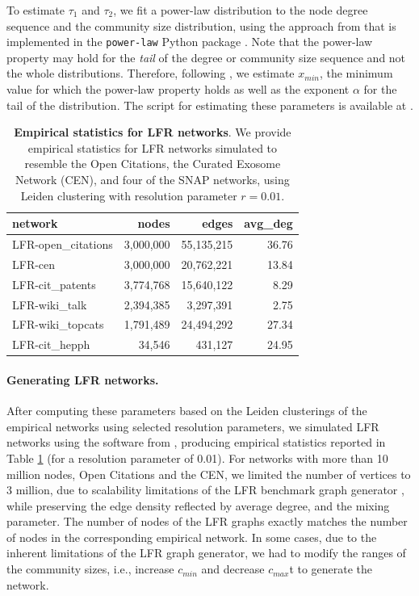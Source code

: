 \documentclass[11pt]{article}   	%
\begin{document}
To estimate $\tau_1$ and $\tau_2$, we fit a power-law distribution to the node degree sequence and the community size distribution, using the approach from \cite{clauset2009power} that is implemented in the \texttt{power-law} Python package \citep{alstott2014powerlaw}. Note that the power-law property may hold for the \textit{tail} of the degree or community size sequence and not the whole distributions. Therefore, following \cite{clauset2009power}, we estimate $x_{min}$, the minimum value for which the power-law property holds as well as the exponent $\alpha$ for the tail of the distribution. The script for estimating these parameters is available at \cite{analysis_scripts}.

\begin{table}[ht]
\centering
\begin{tabular}{lrrr}
  \hline
 network & nodes & edges & avg\_deg \\
  \hline
    LFR-open\_citations & 3,000,000  & 55,135,215 & 36.76 \\
    LFR-cen & 3,000,000 & 20,762,221 & 13.84 \\
    LFR-cit\_patents & 3,774,768 & 15,640,122 & 8.29 \\
    LFR-wiki\_talk & 2,394,385 & 3,297,391 & 2.75 \\
    LFR-wiki\_topcats & 1,791,489 & 24,494,292 & 27.34 \\
    LFR-cit\_hepph &  34,546 & 431,127 & 24.95 \\
 \hline
\end{tabular}
\caption{\textbf{Empirical statistics for LFR networks}. We provide empirical statistics for LFR networks simulated to  resemble the Open Citations, the Curated Exosome Network (CEN), and four of the SNAP networks, using Leiden clustering with resolution parameter $r=0.01$. }
\label{tab:empirical-stats-LFR}
\end{table}

\paragraph{Generating LFR networks.}
After computing these parameters based on the Leiden clusterings of the empirical networks using selected resolution parameters, we simulated LFR networks using the software from \cite{lancichinetti2008benchmark}, producing empirical statistics reported in Table \ref{tab:empirical-stats-LFR} (for a resolution parameter of 0.01). For networks with more than 10 million nodes, Open Citations and the CEN, we limited the number of vertices to 3 million, due to scalability limitations of  the LFR benchmark graph generator \citep{slota2019scalable}, while preserving the edge density reflected by average degree, and the mixing parameter.  The number of nodes of the LFR graphs exactly matches the number of nodes in the corresponding empirical network. In some cases, due to the inherent limitations of the LFR graph generator, we had to modify the ranges of the community sizes, i.e., increase $c_{min}$ and decrease $c_{max}$t to generate the network.
\end{document}
